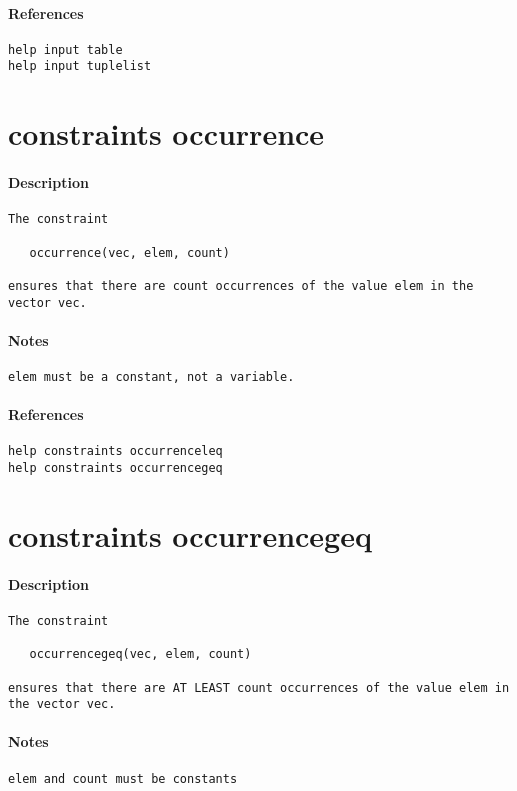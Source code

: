 \paragraph{References}
{\footnotesize
\begin{verbatim}
help input table
help input tuplelist
\end{verbatim}
}
\section{constraints occurrence}
\paragraph{Description}
{\footnotesize
\begin{verbatim}
The constraint

   occurrence(vec, elem, count)

ensures that there are count occurrences of the value elem in the
vector vec.
\end{verbatim}
}
\paragraph{Notes}
{\footnotesize
\begin{verbatim}
elem must be a constant, not a variable.
\end{verbatim}
}
\paragraph{References}
{\footnotesize
\begin{verbatim}
help constraints occurrenceleq
help constraints occurrencegeq
\end{verbatim}
}
\section{constraints occurrencegeq}
\paragraph{Description}
{\footnotesize
\begin{verbatim}
The constraint

   occurrencegeq(vec, elem, count)

ensures that there are AT LEAST count occurrences of the value elem in
the vector vec.
\end{verbatim}
}
\paragraph{Notes}
{\footnotesize
\begin{verbatim}
elem and count must be constants
\end{verbatim}
}
